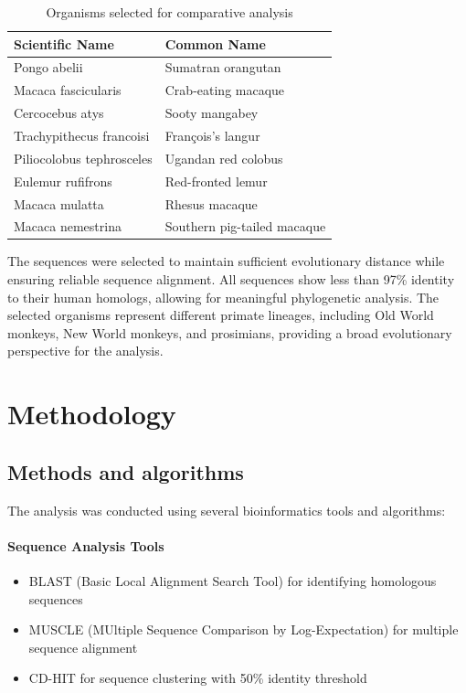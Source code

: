 \documentclass[11pt, a4paper, hidelinks]{article}
\begin{document}
\begin{table}[H]
    \centering
    \caption{Organisms selected for comparative analysis}
    \label{tab:organisms}
    \begin{tabular}{|l|l|}
        \hline
        \textbf{Scientific Name} & \textbf{Common Name} \\
        \hline
        Pongo abelii & Sumatran orangutan \\
        Macaca fascicularis & Crab-eating macaque \\
        Cercocebus atys & Sooty mangabey \\
        Trachypithecus francoisi & François's langur \\
        Piliocolobus tephrosceles & Ugandan red colobus \\
        Eulemur rufifrons & Red-fronted lemur \\
        Macaca mulatta & Rhesus macaque \\
        Macaca nemestrina & Southern pig-tailed macaque \\
        \hline
    \end{tabular}
\end{table}

The sequences were selected to maintain sufficient evolutionary distance while ensuring reliable sequence alignment. All sequences show less than 97\% identity to their human homologs, allowing for meaningful phylogenetic analysis. The selected organisms represent different primate lineages, including Old World monkeys, New World monkeys, and prosimians, providing a broad evolutionary perspective for the analysis.

\section{Methodology}\label{sec:methodology}

\subsection{Methods and algorithms}\label{subsec:methods-and-algorithms}

The analysis was conducted using several bioinformatics tools and algorithms:

\paragraph{Sequence Analysis Tools}
\begin{itemize}
    \item BLAST (Basic Local Alignment Search Tool) for identifying homologous sequences
    \item MUSCLE (MUltiple Sequence Comparison by Log-Expectation) for multiple sequence alignment
    \item CD-HIT for sequence clustering with 50\% identity threshold
\end{itemize}
\end{document}
